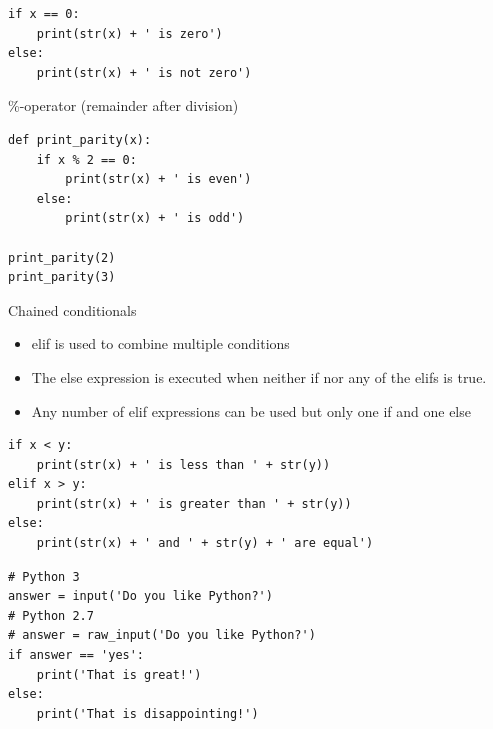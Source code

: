 \documentclass[10pt, a4paper]{beamer} %
\newcommand{\lb}[1]{{\color{mLightBrown}#1}}
\begin{document}
\begin{frame}
\begin{lstlisting}
if x == 0:
    print(str(x) + ' is zero')
else:
    print(str(x) + ' is not zero')
\end{lstlisting}

\framebreak

\begin{examples}
    \begin{block}{\color{mLightBrown}\%-operator (remainder after division)}
    {}
    \end{block}
\end{examples}
\begin{lstlisting}
def print_parity(x):
    if x % 2 == 0:
        print(str(x) + ' is even')
    else:
        print(str(x) + ' is odd')

print_parity(2)
print_parity(3)
\end{lstlisting}

\framebreak

\begin{block}{Chained conditionals}
    \begin{itemize}
        \item \lb{elif} is used to combine multiple conditions
        \item The \lb{else} expression is executed when neither \lb{if} nor any of the \lb{elif}s is true.
        \item Any number of \lb{elif} expressions can be used but only one \lb{if} and one \lb{else}
    \end{itemize}
\end{block}


\framebreak

\begin{examples}
    \begin{lstlisting}
if x < y:
    print(str(x) + ' is less than ' + str(y))
elif x > y:
    print(str(x) + ' is greater than ' + str(y))
else:
    print(str(x) + ' and ' + str(y) + ' are equal')
\end{lstlisting}
\begin{lstlisting}
# Python 3
answer = input('Do you like Python?')
# Python 2.7
# answer = raw_input('Do you like Python?')
if answer == 'yes':
    print('That is great!')
else:
    print('That is disappointing!')    
\end{lstlisting}    
\end{examples}
\end{frame}
\end{document}
